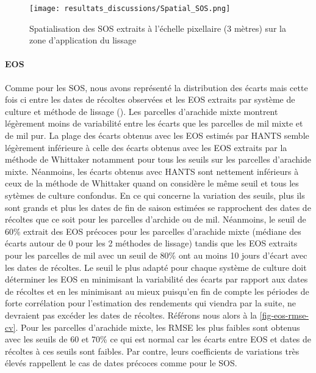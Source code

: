 \begin{figure}[htbp]
 \begin{center}
  \texttt{[image: resultats\_discussions/Spatial\_SOS.png]} 
 \end{center}
 \caption[Spatialisation des SOS]{Spatialisation des SOS extraits à l'échelle pixellaire (3 mètres) sur la zone d'application du lissage}
 \label{fig-spatial-sos}
\end{figure}

\paragraph{EOS}
Comme pour les SOS, nous avons représenté la distribution des écarts mais cette fois ci entre les dates de récoltes observées et les EOS extraits par système de culture et méthode de lissage (). Les parcelles d'arachide mixte montrent légèrement moins de variabilité entre les écarts que les parcelles de mil mixte et de mil pur. La plage des écarts obtenus avec les EOS estimés par HANTS semble légèrement inférieure à celle des écarts obtenus avec les EOS extraits par la méthode de Whittaker notamment pour tous les seuils sur les parcelles d'arachide mixte. Néanmoins, les écarts obtenus avec HANTS sont nettement inférieurs à ceux de la méthode de Whittaker quand on considère le même seuil et tous les sytèmes de culture confondus. En ce qui concerne la variation des seuils, plus ils sont grands et plus les dates de fin de saison estimées se rapprochent 
des dates de récoltes que ce soit pour les parcelles d'archide ou de mil. Néanmoins, le seuil de 60\% extrait des EOS précoces pour les parcelles d'arachide mixte (médiane des écarts autour de $0$ pour les 2 méthodes de lissage) tandis que les EOS extraits pour les parcelles de mil avec un seuil de 80\% ont au moins 10 jours d'écart avec les dates de récoltes. Le seuil le plus adapté pour chaque système de culture doit déterminer les EOS en minimisant la variabilité des écarts par rapport aux dates de récoltes et en les minimisant au mieux puisqu'en fin de compte les périodes de forte corrélation pour l'estimation des rendements qui viendra par la suite, ne devraient pas excéder les dates de récoltes. Référons nous alors à la \cref{fig-eos-rmse-cv}. Pour les parcelles d'arachide mixte, les RMSE les plus faibles sont obtenus avec les seuils de 60 et 70\% ce qui est normal car les écarts entre EOS et dates de récoltes à ces seuils sont faibles. Par contre, leurs coefficients de variations très élevés rappellent le cas de dates précoces comme pour le SOS. 

